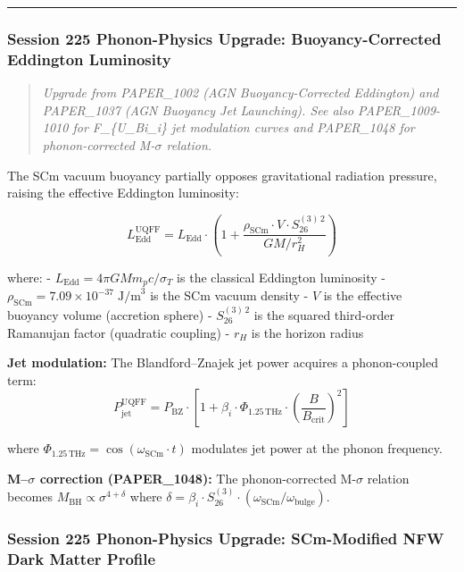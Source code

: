 \begin{center}\rule{0.5\linewidth}{0.5pt}\end{center}

\subsubsection{Session 225 Phonon-Physics Upgrade: Buoyancy-Corrected
Eddington
Luminosity}\label{session-225-phonon-physics-upgrade-buoyancy-corrected-eddington-luminosity}

\begin{quote}
\emph{Upgrade from PAPER\_1002 (AGN Buoyancy-Corrected Eddington) and
PAPER\_1037 (AGN Buoyancy Jet Launching). See also PAPER\_1009-1010 for
F\_\{U\_Bi\_i\} jet modulation curves and PAPER\_1048 for
phonon-corrected M-\(\sigma\) relation.}
\end{quote}

The SCm vacuum buoyancy partially opposes gravitational radiation
pressure, raising the effective Eddington luminosity:

\[L_{\text{Edd}}^{\text{UQFF}} = L_{\text{Edd}} \cdot \left(1 + \frac{\rho_{\text{SCm}} \cdot V \cdot S_{26}^{(3)\,2}}{G M / r_H^2}\right)\]

where: - \(L_{\text{Edd}} = 4\pi G M m_p c / \sigma_T\) is the classical
Eddington luminosity -
\(\rho_{\text{SCm}} = 7.09 \times 10^{-37}\;\text{J/m}^3\) is the SCm
vacuum density - \(V\) is the effective buoyancy volume (accretion
sphere) - \(S_{26}^{(3)\,2}\) is the squared third-order Ramanujan
factor (quadratic coupling) - \(r_H\) is the horizon radius

\textbf{Jet modulation:} The Blandford--Znajek jet power acquires a
phonon-coupled term:
\[P_{\text{jet}}^{\text{UQFF}} = P_{\text{BZ}} \cdot \left[1 + \beta_i \cdot \Phi_{1.25\,\text{THz}} \cdot \left(\frac{B}{B_{\text{crit}}}\right)^2\right]\]

where \(\Phi_{1.25\,\text{THz}} = \cos(\omega_{\text{SCm}} \cdot t)\)
modulates jet power at the phonon frequency.

\textbf{M--\(\sigma\) correction (PAPER\_1048):} The phonon-corrected
M-\(\sigma\) relation becomes
\(M_{\text{BH}} \propto \sigma^{4+\delta}\) where
\(\delta = \beta_i \cdot S_{26}^{(3)} \cdot (\omega_{\text{SCm}}/\omega_{\text{bulge}})\).

\subsubsection{Session 225 Phonon-Physics Upgrade: SCm-Modified NFW Dark
Matter
Profile}\label{session-225-phonon-physics-upgrade-scm-modified-nfw-dark-matter-profile}

